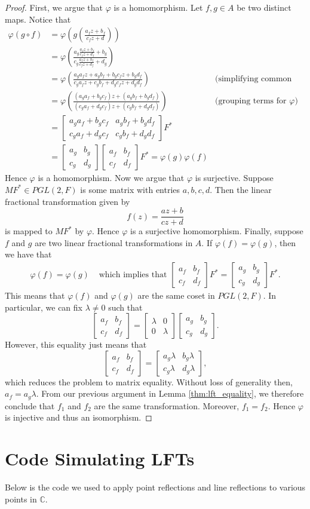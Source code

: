 \documentclass[12pt]{article}
\newcommand{\C}{\mathbb{C}}
\newcommand{\lftmat}[4]{\begin{bmatrix} {#1} & {#2} \\ {#3} & {#4} \end{bmatrix}}
\theoremstyle{plain}
\theoremstyle{definition}
\begin{document}
\begin{appendices}
\begin{proof}
	First, we argue that $\varphi$ is a homomorphism. Let $f,g\in A$ be two distinct maps. Notice that
	\begin{align*}
		\varphi(g\circ f) & = \varphi\left(g\left(\frac{a_fz + b_f}{c_fz + d}\right)\right)\\
		& = \varphi\left(\frac{a_g\frac{a_fz + b_f}{c_fz + d_f} + b_g}{c_g\frac{a_fz + b_f}{c_fz + d_f} + d_g}\right)\\
		& = \varphi\left(\frac{a_ga_fz + a_gb_f + b_gc_fz + b_gd_f}{c_ga_fz + c_gb_f + d_gc_fz + d_gd_f}\right) & \text{(simplifying common denominators)}\\
		& = \varphi\left(\frac{(a_ga_f + b_gc_f)z + (a_gb_f + b_gd_f)}{(c_ga_f + d_gc_f)z + (c_gb_f + d_gd_f)}\right) & \text{(grouping terms for $\varphi$)}\\
		& = \lftmat{a_ga_f + b_gc_f}{a_gb_f + b_gd_f}{c_ga_f + d_gc_f}{c_gb_f + d_gd_f} F^*\\
		& = \lftmat{a_g}{b_g}{c_g}{d_g}\lftmat{a_f}{b_f}{c_f}{d_f}F^* = \varphi(g)\varphi(f)
	\end{align*}
	Hence $\varphi$ is a homomorphism. Now we argue that $\varphi$ is surjective. Suppose $M F^*\in PGL(2,F)$ is some matrix with entries $a,b,c,d$. Then the linear fractional transformation given by 
	\[
		f(z) = \frac{az + b}{cz + d}
	\]
	is mapped to $M F^*$ by $\varphi$. Hence $\varphi$ is a surjective homomorphism. Finally, suppose $f$ and $g$ are two linear fractional transformations in $A$. If $\varphi(f) = \varphi(g)$, then we have that
	\begin{align*}
		\varphi(f) = \varphi(g) & \text{ which implies that } \lftmat{a_f}{b_f}{c_f}{d_f} F^* = \lftmat{a_g}{b_g}{c_g}{d_g} F^*.
	\end{align*}
	This means that $\varphi(f)$ and $\varphi(g)$ are the same coset in $PGL(2,F)$. In particular, we can fix $\lambda\neq 0$ such that
	\[
		\lftmat{a_f}{b_f}{c_f}{d_f} = \lftmat{\lambda}{0}{0}{\lambda}\lftmat{a_g}{b_g}{c_g}{d_g}.
	\]
	However, this equality just means that
	\[
		\lftmat{a_f}{b_f}{c_f}{d_f} = \lftmat{a_g\lambda}{b_g\lambda}{c_g\lambda}{d_g\lambda},
	\]
	which reduces the problem to matrix equality. Without loss of generality then, $a_f = a_g\lambda$. From our previous argument in Lemma \ref{thm:lft_equality}, we therefore conclude that $f_1$ and $f_2$ are the same transformation. Moreover, $f_1 = f_2$. Hence $\varphi$ is injective and thus an isomorphism. 
\end{proof}		

\newpage
\section{Code Simulating LFTs} \label{appendixD}

Below is the code we used to apply point reflections and line reflections to various points in $\C$. 



\end{appendices}



\newpage



\nocite{guggen_book}
\nocite{half_plane_model}
\end{document}
